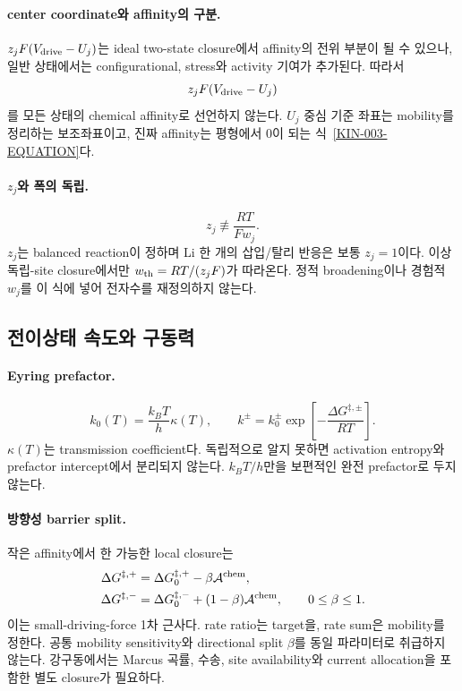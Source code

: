 \paragraph{ center coordinate와 affinity의 구분.}
$z_jF(V_{\mathrm{drive}}-U_j)$는 ideal two-state closure에서 affinity의
전위 부분이 될 수 있으나, 일반 상태에서는 configurational,
stress와 activity 기여가 추가된다. 따라서
\[
z_jF(V_{\mathrm{drive}}-U_j)
\]
를 모든 상태의 chemical affinity로 선언하지 않는다.
$U_j$ 중심 기준 좌표는 mobility를 정리하는 보조좌표이고,
진짜 affinity는 평형에서 0이 되는 식~\eqref{KIN-003-EQUATION}다.

\paragraph{ $z_j$와 폭의 독립.}
\[
\boxed{z_j\not\equiv\frac{RT}{Fw_j}.}
\]
$z_j$는 balanced reaction이 정하며 Li 한 개의 삽입/탈리 반응은
보통 $z_j=1$이다. 이상 독립-site closure에서만
$w_{\rm th}=RT/(z_jF)$가 따라온다. 정적 broadening이나 경험적
$w_j$를 이 식에 넣어 전자수를 재정의하지 않는다.

\subsection{전이상태 속도와 구동력}\label{KIN-CH3-EYRING}

\paragraph{ Eyring prefactor.}
\begin{equation}
k_0(T)=\frac{k_BT}{h}\kappa(T),\qquad
k^\pm=k_0^\pm
\exp\!\left[-\frac{\Delta G^{\ddagger,\pm}}{RT}\right].
\label{KIN-006-EQUATION}
\end{equation}
$\kappa(T)$는 transmission coefficient다. 독립적으로 알지 못하면
activation entropy와 prefactor intercept에서 분리되지 않는다.
$k_BT/h$만을 보편적인 완전 prefactor로 두지 않는다.

\paragraph{ 방향성 barrier split.}
작은 affinity에서 한 가능한 local closure는
\begin{align}
\Delta G^{\ddagger,+}
&=\Delta G_0^{\ddagger,+}-\beta\mathcal A^{\mathrm{chem}},\\
\Delta G^{\ddagger,-}
&=\Delta G_0^{\ddagger,-}+(1-\beta)\mathcal A^{\mathrm{chem}},
\qquad 0\le\beta\le1 .
\end{align}
이는 small-driving-force 1차 근사다. rate ratio는 target을,
rate sum은 mobility를 정한다. 공통 mobility sensitivity와
directional split $\beta$를 동일 파라미터로 취급하지 않는다.
강구동에서는 Marcus 곡률, 수송, site availability와 current
allocation을 포함한 별도 closure가 필요하다.

